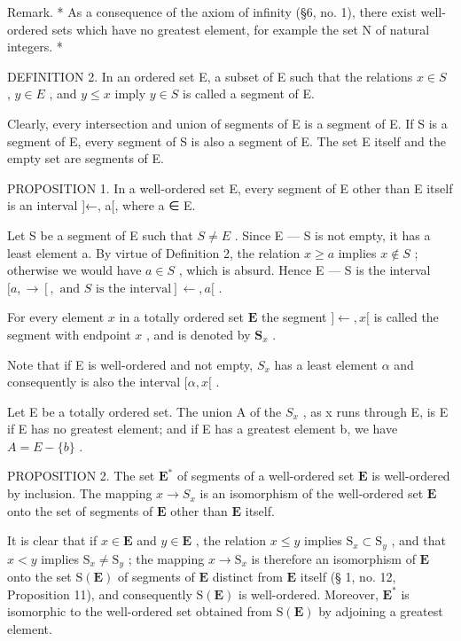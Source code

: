 Remark. * As a consequence of the axiom of infinity (§6, no. 1), there exist well-ordered sets which have no greatest element, for example the set N of natural integers. *

DEFINITION 2. In an ordered set E, a subset of E such that the relations \(x \in S\) , \(y \in E\) , and \(y \leqslant x\) imply \(y \in S\) is called a segment of E.

Clearly, every intersection and union of segments of E is a segment of E. If S is a segment of E, every segment of S is also a segment of E. The set E itself and the empty set are segments of E.

PROPOSITION 1. In a well-ordered set E, every segment of E other than E itself is an interval {]}←, a{[}, where a ∈ E.

Let S be a segment of E such that \(S \neq E\) . Since E --- S is not empty, it has a least element a. By virtue of Definition 2, the relation \(x \geqslant a\) implies \(x \notin S\) ; otherwise we would have \(a \in S\) , which is absurd. Hence E --- S is the interval \([a, \rightarrow[, \text{ and } S \text{ is the interval}] \leftarrow, a[\) .

For every element \(x\) in a totally ordered set \(\mathbf{E}\) the segment \(] \leftarrow, x[\) is called the segment with endpoint \(x\) , and is denoted by \(\mathbf{S}_x\) .

Note that if E is well-ordered and not empty, \(S_{x}\) has a least element \(\alpha\) and consequently is also the interval \([\alpha, x[\) .

Let E be a totally ordered set. The union A of the \(S_{x}\) , as x runs through E, is E if E has no greatest element; and if E has a greatest element b, we have \(A = E - \{b\}\) .

PROPOSITION 2. The set \(\mathbf{E}^*\) of segments of a well-ordered set \(\mathbf{E}\) is well-ordered by inclusion. The mapping \(x \to S_x\) is an isomorphism of the well-ordered set \(\mathbf{E}\) onto the set of segments of \(\mathbf{E}\) other than \(\mathbf{E}\) itself.

It is clear that if \(x \in \mathbf{E}\) and \(y \in \mathbf{E}\) , the relation \(x \leqslant y\) implies \(\mathrm{S}_x \subset \mathrm{S}_y\) , and that \(x < y\) implies \(\mathrm{S}_x \neq \mathrm{S}_y\) ; the mapping \(x \to \mathrm{S}_x\) is therefore an isomorphism of \(\mathbf{E}\) onto the set \(\mathrm{S}(\mathbf{E})\) of segments of \(\mathbf{E}\) distinct from \(\mathbf{E}\) itself (§ 1, no. 12, Proposition 11), and consequently \(\mathrm{S}(\mathbf{E})\) is well-ordered. Moreover, \(\mathbf{E}^*\) is isomorphic to the well-ordered set obtained from \(\mathrm{S}(\mathbf{E})\) by adjoining a greatest element.

